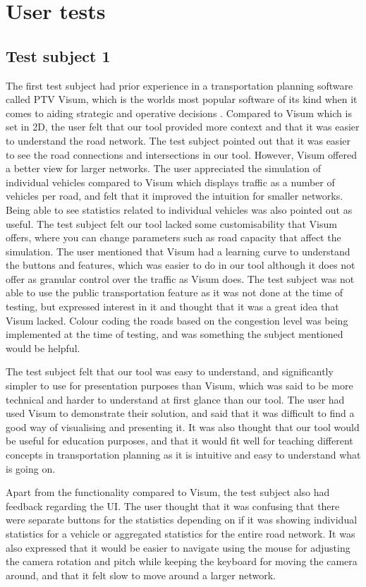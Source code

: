 \section{User tests}
    \subsection{Test subject 1}
        The first test subject had prior experience in a transportation planning software called PTV Visum, which is the worlds most popular software of its kind when it comes to aiding strategic and operative decisions \cite{visum}. Compared to Visum which is set in 2D, the user felt that our tool provided more context and that it was easier to understand the road network. The test subject pointed out that it was easier to see the road connections and intersections in our tool. However, Visum offered a better view for larger networks. The user appreciated the simulation of individual vehicles compared to Visum which displays traffic as a number of vehicles per road, and felt that it improved the intuition for smaller networks. Being able to see statistics related to individual vehicles was also pointed out as useful. The test subject felt our tool lacked some customisability that Visum offers, where you can change parameters such as road capacity that affect the simulation. The user mentioned that Visum had a learning curve to understand the buttons and features, which was easier to do in our tool although it does not offer as granular control over the traffic as Visum does. The test subject was not able to use the public transportation feature as it was not done at the time of testing, but expressed interest in it and thought that it was a great idea that Visum lacked. Colour coding the roads based on the congestion level was being implemented at the time of testing, and was something the subject mentioned would be helpful.

        The test subject felt that our tool was easy to understand, and significantly simpler to use for presentation purposes than Visum, which was said to be more technical and harder to understand at first glance than our tool. The user had used Visum to demonstrate their solution, and said that it was difficult to find a good way of visualising and presenting it. It was also thought that our tool would be useful for education purposes, and that it would fit well for teaching different concepts in transportation planning as it is intuitive and easy to understand what is going on.

        Apart from the functionality compared to Visum, the test subject also had feedback regarding the UI. The user thought that it was confusing that there were separate buttons for the statistics depending on if it was showing individual statistics for a vehicle or aggregated statistics for the entire road network. It was also expressed that it would be easier to navigate using the mouse for adjusting the camera rotation and pitch while keeping the keyboard for moving the camera around, and that it felt slow to move around a larger network.